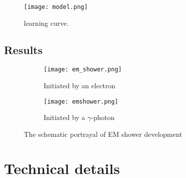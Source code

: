 \begin{figure}[htpb]
	\centering
	\texttt{[image: model.png]}
	\caption{learning curve. }
	\label{fig::nnlearn}
\end{figure} 

\subsection{Results}
\begin{figure}[htpb]
  	\begin{subfigure}[t]{0.5\textwidth}
	\texttt{[image: em\_shower.png]}
	\caption[Started by an electron]{Initiated by an electron}
	\label{fig::id}
\end{subfigure}
\hfill
\begin{subfigure}[t]{0.5\textwidth} 
	\texttt{[image: emshower.png]}
	\caption[Started by a $\gamma$-photon]{Initiated by a $\gamma$-photon}
	\label{fig::pd}
\end{subfigure}
\caption{The schematic portrayal of EM shower development}
\label{fig::em_shower}
\end{figure}
\section{Technical details}
